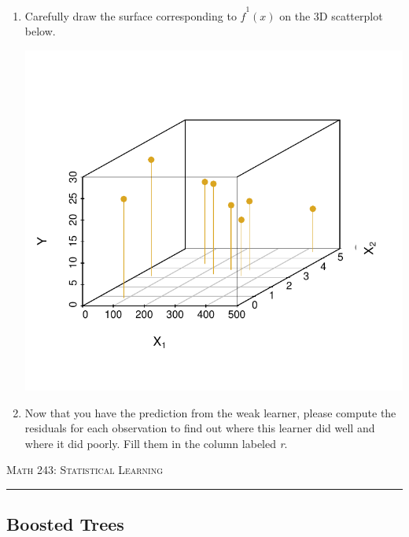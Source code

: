 \documentclass{article}\usepackage[]{graphicx}\usepackage[]{color}
\begin{document}
\begin{enumerate}
\begin{minipage}[t]{.4\textwidth}
\end{minipage}

\vspace{8mm}
\item Carefully draw the surface corresponding to $\hat{f}^1(x)$ on the 3D scatterplot below.

\vspace{-8mm}

\begin{center}
{\includegraphics[scale=0.9]{scatterA.pdf}}
\end{center}

\vspace{-8mm}

\item Now that you have the prediction from the weak learner, please compute the residuals for each observation to find out where this learner did well and where it did poorly. Fill them in the column labeled \emph{r}.

\end{enumerate}

\newpage

\begin{center}
\textsc{Math 243: Statistical Learning} \\
\noindent\rule{12cm}{0.4pt}
\end{center}

\subsection*{Boosted Trees}
\end{document}
